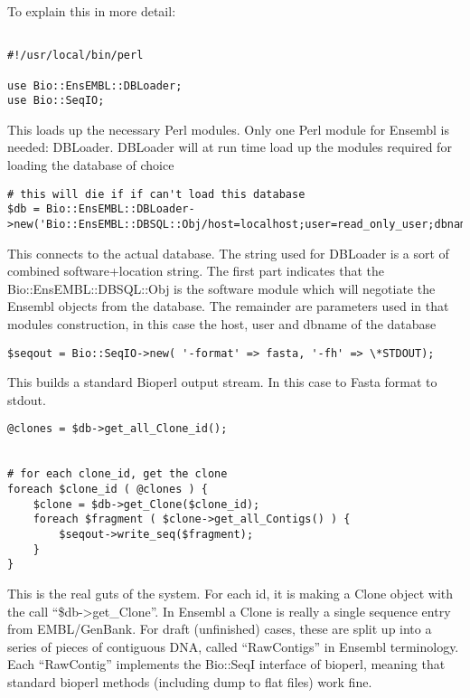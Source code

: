 \documentclass[11pt,a4paper]{article}
\begin{document}
To explain this in more detail:

\begin{verbatim}

#!/usr/local/bin/perl

use Bio::EnsEMBL::DBLoader;
use Bio::SeqIO;

\end{verbatim}

This loads up the necessary Perl modules. Only one Perl module for Ensembl is needed: DBLoader.
DBLoader will at run time load up the modules required for loading the database of choice

\begin{verbatim}
# this will die if if can't load this database
$db = Bio::EnsEMBL::DBLoader->new('Bio::EnsEMBL::DBSQL::Obj/host=localhost;user=read_only_user;dbname=test_ensembl');
\end{verbatim}

This connects to the actual database. The string used for DBLoader is a sort of combined software+location
string. The first part indicates that the Bio::EnsEMBL::DBSQL::Obj is the software module which will
negotiate the Ensembl objects from the database. The remainder are parameters used in that modules
construction, in this case the host, user and dbname of the database

\begin{verbatim}
$seqout = Bio::SeqIO->new( '-format' => fasta, '-fh' => \*STDOUT);
\end{verbatim}

This builds a standard Bioperl output stream. In this case to Fasta format to stdout.

\begin{verbatim}
@clones = $db->get_all_Clone_id();


# for each clone_id, get the clone
foreach $clone_id ( @clones ) {
	$clone = $db->get_Clone($clone_id);
	foreach $fragment ( $clone->get_all_Contigs() ) {
		$seqout->write_seq($fragment);
   	}
}
\end{verbatim}

This is the real guts of the system. For each id, it is making a Clone
object with the call ``\$db->get\_Clone''. In Ensembl a Clone is
really a single sequence entry from EMBL/GenBank. For draft
(unfinished) cases, these are split up into a series of pieces of
contiguous DNA, called ``RawContigs'' in Ensembl terminology. Each
``RawContig'' implements the Bio::SeqI interface of bioperl, meaning
that standard bioperl methods (including dump to flat files) work
fine.
\end{document}
